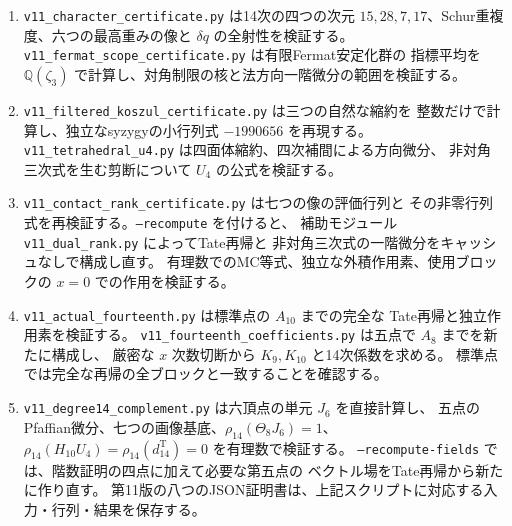 \begin{enumerate}
 \item \texttt{v11\_character\_certificate.py} は14次の四つの次元
 $15,28,7,17$、Schur重複度、六つの最高重みの像と $\delta q$ の全射性を検証する。
 \texttt{v11\_fermat\_scope\_certificate.py} は有限Fermat安定化群の
 指標平均を $\mathbb Q(\zeta_3)$ で計算し、対角制限の核と法方向一階微分の範囲を検証する。
 \item \texttt{v11\_filtered\_koszul\_certificate.py} は三つの自然な縮約を
 整数だけで計算し、独立なsyzygyの小行列式 $-1990656$ を再現する。
 \texttt{v11\_tetrahedral\_u4.py} は四面体縮約、四次補間による方向微分、
 非対角三次式を生む剪断について $U_4$ の公式を検証する。
 \item \texttt{v11\_contact\_rank\_certificate.py} は七つの像の評価行列と
 その非零行列式を再検証する。\texttt{--recompute} を付けると、
 補助モジュール \texttt{v11\_dual\_rank.py} によってTate再帰と
 非対角三次式の一階微分をキャッシュなしで構成し直す。
 有理数でのMC等式、独立な外積作用素、使用ブロックの $x=0$ での作用を検証する。
 \item \texttt{v11\_actual\_fourteenth.py} は標準点の $A_{10}$ までの完全な
 Tate再帰と独立作用素を検証する。
 \texttt{v11\_fourteenth\_coefficients.py} は五点で $A_8$ までを新たに構成し、
 厳密な $x$ 次数切断から $K_9,K_{10}$ と14次係数を求める。
 標準点では完全な再帰の全ブロックと一致することを確認する。
 \item \texttt{v11\_degree14\_complement.py} は六頂点の単元 $J_6$ を直接計算し、
 五点のPfaffian微分、七つの画像基底、$\rho_{14}(\Theta_8J_6)=1$、
 $\rho_{14}(H_{10}U_4)=\rho_{14}(d^{\mathrm T}_{14})=0$ を有理数で検証する。
 \texttt{--recompute-fields} では、階数証明の四点に加えて必要な第五点の
 ベクトル場をTate再帰から新たに作り直す。
 第11版の八つのJSON証明書は、上記スクリプトに対応する入力・行列・結果を保存する。


\end{enumerate}
